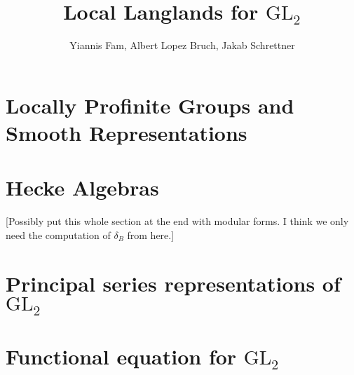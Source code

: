 \documentclass{article}
\title{Local Langlands for $\mathrm{GL}_2$}
\author{Yiannis Fam, Albert Lopez Bruch, Jakab Schrettner}
\newcommand{\GL}{\mathrm{GL}}
\theoremstyle{plain}
\theoremstyle{definition}
\begin{document}
	\maketitle

\section{Locally Profinite Groups and Smooth Representations}



\section{Hecke Algebras}
[Possibly put this whole section at the end with modular forms. I think we only need the computation of $\delta_B$ from here.]




%

\section{Principal series representations of \texorpdfstring{$\GL_2$}{TEXT}}



\section{Functional equation for \texorpdfstring{$\GL_2$}{TEXT}}


\newpage



\end{document}
